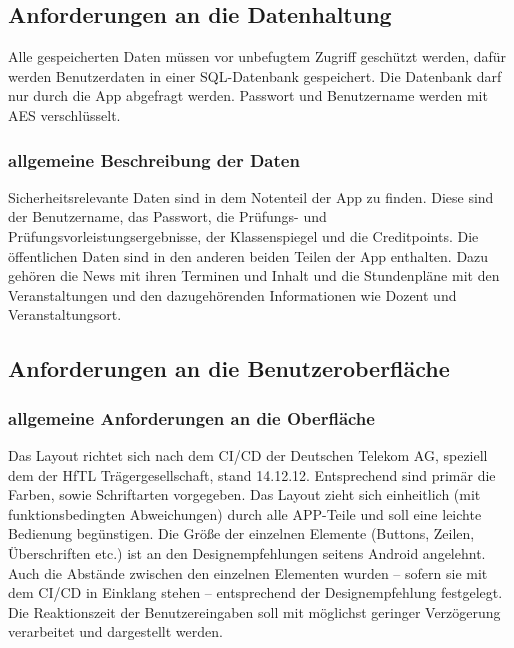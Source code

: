 \subsection{\textbf{Anforderungen an die Datenhaltung}}

Alle gespeicherten Daten müssen vor unbefugtem Zugriff geschützt werden, dafür werden Benutzerdaten in einer \acs{SQL}-Datenbank gespeichert. Die Datenbank darf nur durch die App abgefragt werden. Passwort und Benutzername werden mit \acs{AES} verschlüsselt.

\subsubsection{allgemeine Beschreibung der Daten}
Sicherheitsrelevante Daten sind in dem Notenteil der App zu finden. Diese sind der Benutzername, das Passwort, die Prüfungs- und Prüfungsvorleistungsergebnisse, der Klassenspiegel und die Creditpoints.
Die öffentlichen Daten sind in den anderen beiden Teilen der App enthalten.
Dazu gehören die News mit ihren Terminen und Inhalt und die Stundenpläne mit den Veranstaltungen und den dazugehörenden Informationen wie Dozent und Veranstaltungsort.


\subsection{\textbf{Anforderungen an die Benutzeroberfläche}}

\subsubsection{allgemeine Anforderungen an die Oberfläche}

Das Layout richtet sich nach dem  \ac{CI/CD} der Deutschen Telekom AG, speziell dem der \acs{HfTL} Trägergesellschaft, stand 14.12.12. Entsprechend sind primär die Farben, sowie Schriftarten vorgegeben. Das Layout zieht sich einheitlich (mit funktionsbedingten Abweichungen) durch alle APP-Teile und soll eine leichte Bedienung begünstigen.
Die Größe der einzelnen Elemente (Buttons, Zeilen, Überschriften etc.) ist an den Designempfehlungen seitens Android angelehnt. 
Auch die Abstände zwischen den einzelnen Elementen wurden – sofern sie mit dem \ac{CI/CD} in Einklang stehen – entsprechend der Designempfehlung festgelegt.
Die Reaktionszeit der Benutzereingaben soll mit möglichst geringer Verzögerung verarbeitet und dargestellt werden.







